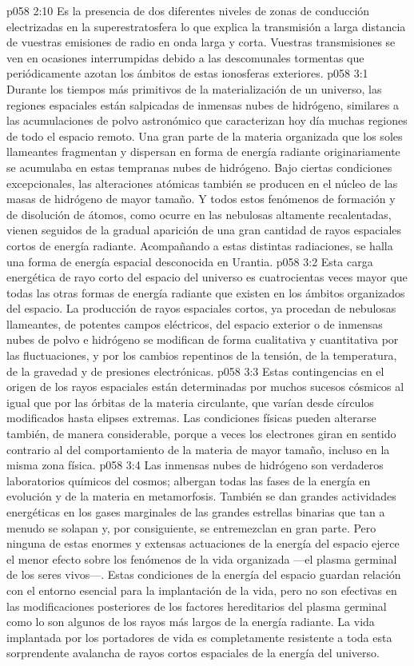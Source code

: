 \vs p058 2:10 Es la presencia de dos diferentes niveles de zonas de conducción electrizadas en la superestratosfera lo que explica la transmisión a larga distancia de vuestras emisiones de radio en onda larga y corta. Vuestras transmisiones se ven en ocasiones interrumpidas debido a las descomunales tormentas que periódicamente azotan los ámbitos de estas ionosferas exteriores.
\vs p058 3:1 Durante los tiempos más primitivos de la materialización de un universo, las regiones espaciales están salpicadas de inmensas nubes de hidrógeno, similares a las acumulaciones de polvo astronómico que caracterizan hoy día muchas regiones de todo el espacio remoto. Una gran parte de la materia organizada que los soles llameantes fragmentan y dispersan en forma de energía radiante originariamente se acumulaba en estas tempranas nubes de hidrógeno. Bajo ciertas condiciones excepcionales, las alteraciones atómicas también se producen en el núcleo de las masas de hidrógeno de mayor tamaño. Y todos estos fenómenos de formación y de disolución de átomos, como ocurre en las nebulosas altamente recalentadas, vienen seguidos de la gradual aparición de una gran cantidad de rayos espaciales cortos de energía radiante. Acompañando a estas distintas radiaciones, se halla una forma de energía espacial desconocida en Urantia.
\vs p058 3:2 Esta carga energética de rayo corto del espacio del universo es cuatrocientas veces mayor que todas las otras formas de energía radiante que existen en los ámbitos organizados del espacio. La producción de rayos espaciales cortos, ya procedan de nebulosas llameantes, de potentes campos eléctricos, del espacio exterior o de inmensas nubes de polvo e hidrógeno se modifican de forma cualitativa y cuantitativa por las fluctuaciones, y por los cambios repentinos de la tensión, de la temperatura, de la gravedad y de presiones electrónicas.
\vs p058 3:3 Estas contingencias en el origen de los rayos espaciales están determinadas por muchos sucesos cósmicos al igual que por las órbitas de la materia circulante, que varían desde círculos modificados hasta elipses extremas. Las condiciones físicas pueden alterarse también, de manera considerable, porque a veces los electrones giran en sentido contrario al del comportamiento de la materia de mayor tamaño, incluso en la misma zona física.
\vs p058 3:4 Las inmensas nubes de hidrógeno son verdaderos laboratorios químicos del cosmos; albergan todas las fases de la energía en evolución y de la materia en metamorfosis. También se dan grandes actividades energéticas en los gases marginales de las grandes estrellas binarias que tan a menudo se solapan y, por consiguiente, se entremezclan en gran parte. Pero ninguna de estas enormes y extensas actuaciones de la energía del espacio ejerce el menor efecto sobre los fenómenos de la vida organizada ---el plasma germinal de los seres vivos---. Estas condiciones de la energía del espacio guardan relación con el entorno esencial para la implantación de la vida, pero no son efectivas en las modificaciones posteriores de los factores hereditarios del plasma germinal como lo son algunos de los rayos más largos de la energía radiante. La vida implantada por los portadores de vida es completamente resistente a toda esta sorprendente avalancha de rayos cortos espaciales de la energía del universo.
